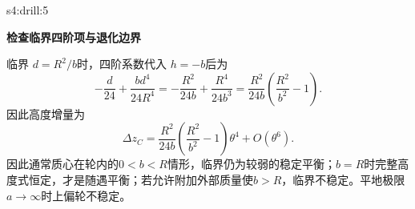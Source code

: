 \begin{drillsolution}{s4:drill:5}
\par\medskip{}\noindent\textbf{检查临界四阶项与退化边界}\par\nobreak
临界 $d=R^2/b$时，四阶系数代入 $h=-b$后为
\[-\frac d{24}+\frac{bd^4}{24R^4}
 =-\frac{R^2}{24b}+\frac{R^4}{24b^3}
 =\frac{R^2}{24b}\left(\frac{R^2}{b^2}-1\right).\]
因此高度增量为
\[
\Delta z_C=\frac{R^2}{24b}\left(\frac{R^2}{b^2}-1\right)\theta^4+O(\theta^6).
\]
因此通常质心在轮内的$0<b<R$情形，临界仍为较弱的稳定平衡；$b=R$时完整高度式恒定，才是随遇平衡；若允许附加外部质量使$b>R$，临界不稳定。平地极限$a\to\infty$时上偏轮不稳定。\end{drillsolution}
